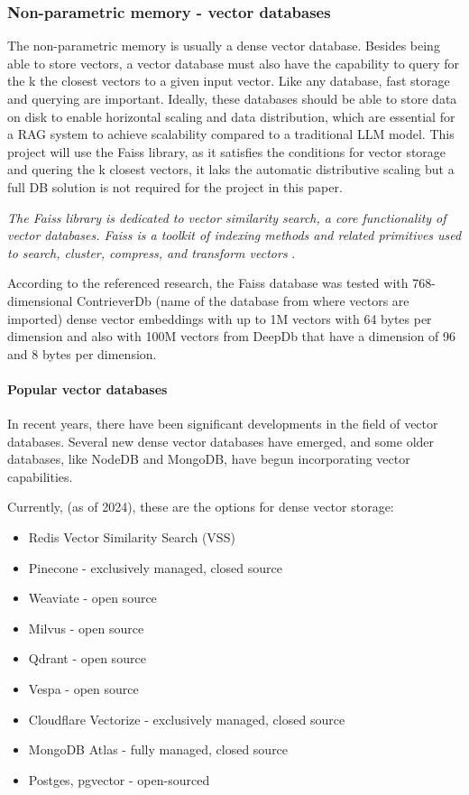 \documentclass{wseas}
\begin{document}
\subsubsection{Non-parametric memory - vector databases}

The non-parametric memory is usually a dense vector database. Besides
being able to store vectors, a vector database must also have the
capability to query for the k the closest vectors to a given input
vector. Like any database, fast storage and querying are important.
Ideally, these databases should be able to store data on disk to enable
horizontal scaling and data distribution, which are essential for a RAG
system to achieve scalability compared to a traditional LLM model. This
project will use the Faiss library, as it satisfies the conditions for
vector storage and quering the k closest vectors, it laks the automatic
distributive scaling but a full DB solution is not required for the
project in this paper.

\emph{The Faiss library is dedicated to vector similarity search, a core
functionality of vector databases. Faiss is a toolkit of indexing
methods and related primitives used to search, cluster, compress, and
transform vectors} \cite{cite2}.

According to the referenced research, the Faiss database was tested with
768-dimensional ContrieverDb (name of the database from where vectors
are imported) dense vector embeddings with up to 1M vectors with 64
bytes per dimension and also with 100M vectors from DeepDb that have a
dimension of 96 and 8 bytes per dimension.

\paragraph{Popular vector databases}

In recent years, there have been significant developments in the field
of vector databases. Several new dense vector databases have emerged,
and some older databases, like NodeDB and MongoDB, have begun
incorporating vector capabilities.

Currently, (as of 2024), these are the options for dense vector storage:

\begin{itemize}

\item
  Redis Vector Similarity Search (VSS)
\item
  Pinecone - exclusively managed, closed source
\item
  Weaviate - open source
\item
  Milvus - open source
\item
  Qdrant - open source
\item
  Vespa - open source
\item
  Cloudflare Vectorize - exclusively managed, closed source
\item
  MongoDB Atlas - fully managed, closed source
\item
  Postges, pgvector - open-sourced
\end{itemize}
\end{document}
